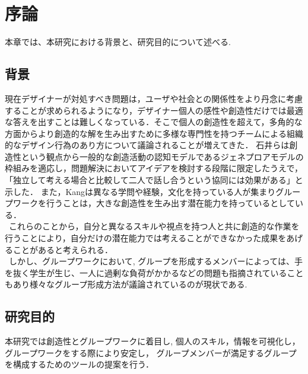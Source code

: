 \documentclass{funthesis}
\begin{document}
\tableofcontents %


\chapter{序論} %

本章では、本研究における背景と、研究目的について述べる.


\section{背景} %


現在デザイナーが対処すべき問題は，ユーザや社会との関係性をより丹念に考慮することが求められるようになり，デザイナー個人の感性や創造性だけでは最適な答えを出すことは難しくなっている．そこで個人の創造性を超えて，多角的な方面からより創造的な解を生み出すために多様な専門性を持つチームによる組織的なデザイン行為のあり方について議論されることが増えてきた\cite{A1}． 石井らは創造性という観点から一般的な創造活動の認知モデルであるジェネプロアモデルの枠組みを適応し，問題解決においてアイデアを検討する段階に限定したうえで，「独立して考える場合と比較して二人で話し合うという協同には効果がある」と示した\cite{A2}． また，Kangは異なる学問や経験，文化を持っている人が集まりグループワークを行うことは，大きな創造性を生み出す潜在能力を持っている\cite{A3}としている．\\
\ これらのことから，自分と異なるスキルや視点を持つ人と共に創造的な作業を行うことにより，自分だけの潜在能力では考えることができなかった成果をあげることがあると考えられる．\\
\ しかし、グループワークにおいて, グループを形成するメンバーによっては、手を抜く学生が生じ、一人に過剰な負荷がかかるなどの問題も指摘されていることもあり\cite{A4}様々なグループ形成方法が議論されているのが現状である.

\section{研究目的}
本研究では創造性とグループワークに着目し,  個人のスキル，情報を可視化し，グループワークをする際により安定し，
グループメンバーが満足するグループを構成するためのツールの提案を行う．
\end{document}

